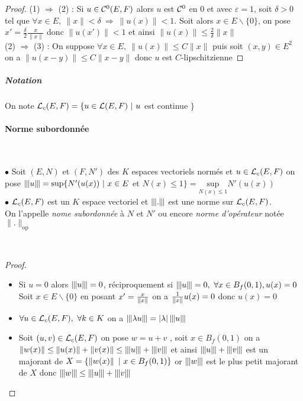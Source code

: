 		\begin{proof}
		{\small (1)} $\Rightarrow$ {\small (2)} : Si $u\in \cont^0 (E,F)$ alors $u$ est $\cont^0$ en $0$ et avec $\varepsilon = 1$, soit $\delta >0$ tel que $\forall x\in E , ~\| x \| < \delta ~\Rightarrow ~\| u(x) \| < 1$. Soit alors $x\in E\backslash \{0\}$, on pose $x' = \frac{\delta}{2}\frac{x}{\| x \|}$ donc $\| u(x' ) \| <1$ et ainsi 
		$\| u(x) \| \leq \frac{2}{\delta} \| x \|$ \medskip \\ 
		{\small (2)} $\Rightarrow$ {\small (3)} : On suppose $\forall x\in E , ~\| u(x) \| \leq C\| x \| $ puis soit $(x,y) \in E^2$ 
		\\ on a $\| u(x-y) \| \leq C \| x-y \|$ donc $u$ est $C$-lipschitzienne
		\end{proof} \medskip
		
		\subparagraph{Notation}
			On note $\lin_c (E,F) = \{u\in \lin (E,F) ~|~u$ est continue $\}$ 
		
		\newpage
		
		\traitd 
		\paragraph{Norme subordonnée} ~ \vspace{5pt} \\
			\hspace*{15pt} {\vrule width 1pt} \kern2pt
			\begin{minipage}{0.9\textwidth}
				$\bullet$ Soit $(E,N)$ et $(F,N' )$ des $K$ espaces vectoriels normés et $u\in \lin_c (E,F)$ on pose $\normop{u} = \mathrm{sup} \{N' (u(x)) ~|~x\in E$ et $N(x) \leq 1 \} = \underset{N(x)\leq 1}{\mathrm{sup}} N' (u(x))$\\
				$\bullet$ $\lin_c (E,F)$ est un $K$ espace vectoriel et $\normop{.}$ est une norme sur $\lin_c (E,F)$. \\ 
				On l'appelle \emph{nome subordonnée} à $N$ et $N'$ ou encore \emph{norme d'opérateur} notée $\| . \|_{\mathrm{op}}$ 
			\end{minipage} ~\\
			
		\trait 
		
		\begin{proof} ~
		\begin{itemize}
			\item Si $u=0$ alors $\normop{u} = 0$, réciproquement si $\normop{u} = 0 ,~\forall x\in B_f(0,1), u(x) = 0$ Soit $x\in E\backslash \{0\}$ en posant $x' = \frac{x}{\norm{x}}$  on a $\frac{1}{\norm{x}}u(x) = 0$ donc $u(x)=0$
			\item $\forall u\in \lin_c (E,F) ,~\forall k\in K$ on a $\normop{\lambda u} = \abs{\lambda }\normop{u}$
			\item Soit $(u,v) \in \lin_c (E,F)$ on pose $w=u+v$ , soit $x\in B_f(0,1)$ on a  $\norm{w(x)} \leq \norm{u(x)} + \norm{v(x)} \leq \normop{u} + \normop{v}$ et ainsi $\normop{u} + \normop{v}$ est un majorant de  $X=\{\norm{w(x)} ~|~x\in B_f(0,1) \}$ or $\normop{w}$ est le plus petit majorant de $X$ donc $\normop{w} \leq \normop{u}+\normop{v}$
		\end{itemize}
		\end{proof} \medskip
		
